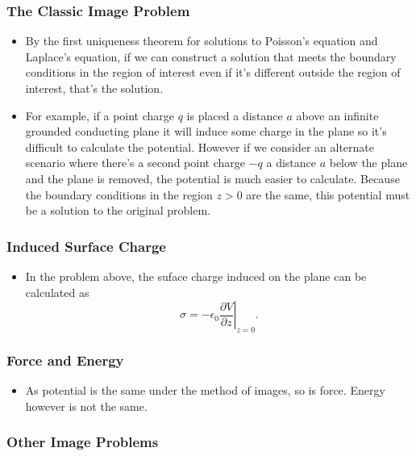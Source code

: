 \documentclass{article}
\begin{document}
\subsubsection{The Classic Image Problem}

\begin{itemize}
  \item By the first uniqueness theorem for solutions to Poisson's equation and Laplace's equation, if we can construct a solution that meets the boundary conditions in the region of interest even if it's different outside the region of interest, that's the solution.

  \item For example, if a point charge $q$ is placed a distance $a$ above an infinite grounded conducting plane it will induce some charge in the plane so it's difficult to calculate the potential. However if we consider an alternate scenario where there's a second point charge $-q$ a distance $a$ below the plane and the plane is removed, the potential is much easier to calculate. Because the boundary conditions in the region $z > 0$ are the same, this potential must be a solution to the original problem.
\end{itemize}

\subsubsection{Induced Surface Charge}

\begin{itemize}
  \item In the problem above, the suface charge induced on the plane can be calculated as \[\sigma = -\epsilon_0 \left. \frac{\partial V}{\partial z} \right|_{z = 0}.\]
\end{itemize}

\subsubsection{Force and Energy}

\begin{itemize}
  \item As potential is the same under the method of images, so is force. Energy however is not the same.
\end{itemize}

\subsubsection{Other Image Problems}
\end{document}
